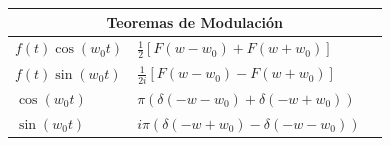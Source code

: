 \documentclass[12pt, fleqn]{report}                             %
\theoremstyle{break}                                            %
\newcommand{\Wrap}[1]           {\left( #1 \right)}             %
\newcommand{\Cos}[1] {\cos\Wrap{#1}}                            %
\newcommand{\Sin}[1] {\sin\Wrap{#1}}                            %
\begin{document}
\begin{table}[ht]
\begin{tabular}{|m{16em}|m{16em}|@{}m{0pt}@{}}
                    \multicolumn{3}{|c|}{Teoremas de Modulación}                        \\            \hline
                    $f(t) \Cos{w_0t}  $     & $\frac{1}{2}[F(w-w_0)+F(w+w_0)]           $ &\\[1em]    \hline
                    $f(t) \Sin{w_0t}  $     & $\frac{1}{2i}[F(w-w_0)-F(w+w_0)]          $ &\\[1em]    \hline
                    $\Cos{w_0t}       $     & $\pi(\delta(-w-w_0)+\delta(-w+w_0))       $ &\\[1em]    \hline
                    $\Sin{w_0t}       $     & $i\pi(\delta(-w+w_0)-\delta(-w-w_0))      $ &\\[1em]    \hline
                    
                
                \end{tabular}
            \end{table}

            \clearpage
\end{document}

